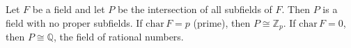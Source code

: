 Let $F$ be a field and let $P$ be the intersection of all subfields of $F$. Then $P$ is a field with no proper subfields. If $\mathrm{char}\,F = p$ (prime), then $P \cong \mathbb{Z}_p$. If $\mathrm{char}\,F = 0$, then $P \cong \mathbb{Q}$, the field of rational numbers.
